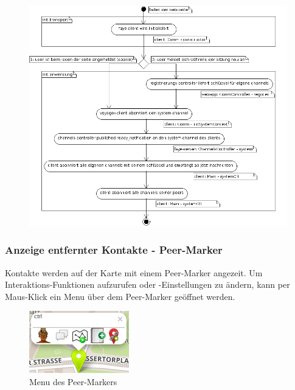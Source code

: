   \begin{figure}[H]
      \centering
	  \includegraphics[scale=0.48]{bilder/uml/register.png}
  	  \label{fig:COMM_INF_INIT}
  \end{figure}

\subsubsection{Anzeige entfernter Kontakte - Peer-Marker}
Kontakte werden auf der Karte mit einem Peer-Marker angezeit. Um Interaktions-Funktionen aufzurufen oder -Einstellungen zu ändern, kann per Maus-Klick ein Menu über dem Peer-Marker geöffnet werden.
  \begin{figure}[H]
      \centering
	  \includegraphics[scale=0.8]{bilder/screenshots/menu_peermarker.png}\\
  	  Menu des Peer-Markers
  \end{figure}

